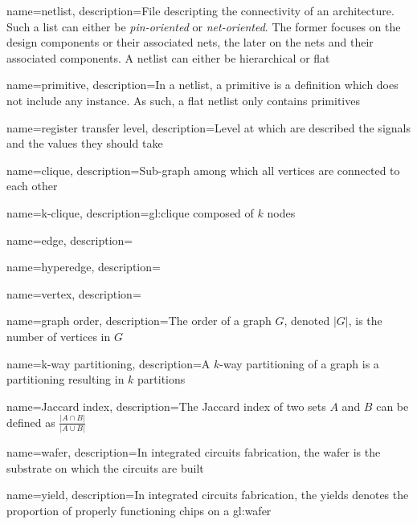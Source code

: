 {
	name=netlist,
	description={File descripting the connectivity of an architecture.
				Such a list can either be \textit{pin-oriented} or \textit{net-oriented}.
				The former focuses on the design components or their associated nets, the later on the nets and their associated components.
				\newline
				A netlist can either be hierarchical or flat}
}

{
	name=primitive,
	description={In a netlist, a primitive is a definition which does not include any instance.
				As such, a flat netlist only contains primitives}
}


{
	name=register transfer level,
	description={Level at which are described the signals and the values they should take}
}

{
	name=clique,
	description={Sub-graph among which all vertices are connected to each other}
}

{
	name=k-clique,
	description={\Gls{gl:clique} composed of $k$ nodes}
}

{
	name=edge,
	description={}
}

{
	name=hyperedge,
	description={}
}

{
	name=vertex,%
	description={}
}

{
	name=graph order,
	description={The order of a graph $G$, denoted $|G|$, is the number of vertices in $G$}
}

{
	name=k-way partitioning,
	description={A $k$-way partitioning of a graph is a partitioning resulting in $k$ partitions}
}

{
	name=Jaccard index,
	description={The Jaccard index of two sets $A$ and $B$ can be defined as $\frac{|A \cap B|}{|A \cup B|}$}
}

{
	name=wafer,
	description={In integrated circuits fabrication, the wafer is the substrate on which the circuits are built}
}

{
	name=yield,
	description={In integrated circuits fabrication, the yields denotes the proportion of properly functioning chips on a \gls{gl:wafer}}
}

